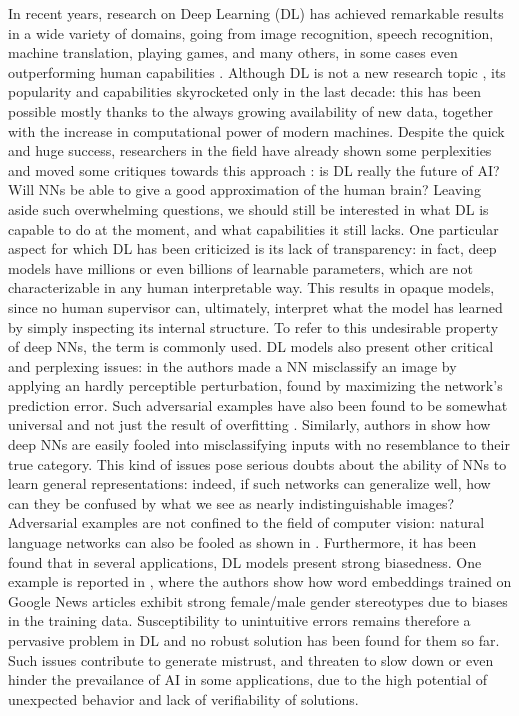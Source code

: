 In recent years, research on Deep Learning (DL) has achieved remarkable results in a wide variety of domains, going from image recognition, speech recognition, machine translation, playing games, and many others, 
	in some cases even outperforming human capabilities \cite{jumper2021highly, gebru2017using, schrittwieser2020mastering}. 
Although DL is not a new research topic \cite{lecun1989digits,rosenblatt1958perceptron}, its popularity and capabilities skyrocketed only in the last decade: this has been possible mostly thanks to the always growing availability of new data, together with the increase in computational power of modern machines.
Despite the quick and huge success, researchers in the field have already shown some perplexities and moved some critiques towards this approach \cite{marcus2018appraisal,sabour2017dynamic}: is DL really the future of AI? Will NNs be able to give a good approximation of the human brain? Leaving aside such overwhelming questions, we should still be interested in what DL is capable to do at the moment, and what capabilities it still lacks.
One particular aspect for which DL has been criticized is its lack of transparency: in fact, deep models have millions or even billions of learnable parameters, which are not characterizable in any human interpretable way. This results in opaque models, since no human supervisor can, ultimately, interpret what the model has learned by simply inspecting its internal structure. To refer to this undesirable property of deep NNs, the term  is commonly used. DL models also present other critical and perplexing issues: in \cite{szegedy2013intriguing} the authors made a NN misclassify an image by applying an hardly perceptible perturbation, found by maximizing the network’s prediction error. Such adversarial examples have also been found to be somewhat universal and not just the result of overfitting \cite{buckner2020adversarial}. Similarly, authors in \cite{nguyen2015fooled} show how deep NNs are easily fooled into misclassifying inputs with no resemblance to their true category. This kind of issues pose serious doubts about the ability of NNs to learn general representations: indeed, if such networks can generalize well, how can they be confused by what we see as nearly indistinguishable images?  Adversarial examples are not confined to the field of computer vision: natural language networks can also be fooled as shown in \cite{jia2017adversarial,zhang2019generating}. Furthermore, it has been found that in several applications, DL models present strong biasedness. One example is reported in \cite{bolukbasi2016debiasing}, where the authors show how word embeddings trained on Google News articles exhibit strong female/male gender stereotypes due to biases in the training data. Susceptibility to unintuitive errors remains therefore a pervasive problem in DL and no robust solution has been found for them so far. Such issues contribute to generate mistrust, and threaten to slow down or even hinder the prevailance of AI in some applications, due to the high potential of unexpected behavior and lack of verifiability of solutions.
